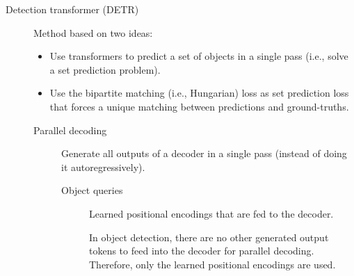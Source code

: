 \begin{description}
    \item[Detection transformer (DETR)] 
        Method based on two ideas:
        \begin{itemize}
            \item Use transformers to predict a set of objects in a single pass (i.e., solve a set prediction problem).
            \item Use the bipartite matching (i.e., Hungarian) loss as set prediction loss that forces a unique matching between predictions and ground-truths.
        \end{itemize}

        \begin{description}
            \item[Parallel decoding] 
                Generate all outputs of a decoder in a single pass (instead of doing it autoregressively).

                \begin{description}
                    \item[Object queries] 
                        Learned positional encodings that are fed to the decoder.

                        \begin{remark}
                            In object detection, there are no other generated output tokens to feed into the decoder for parallel decoding. Therefore, only the learned positional encodings are used.
                        \end{remark}
                \end{description}
        \end{description}
\end{description}